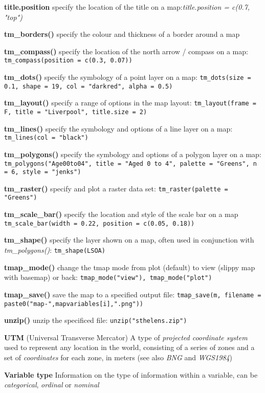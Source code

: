 \documentclass[a4paper,10pt]{article}
\begin{document}
\begin{multicols}{2}
\textbf{title.position} specify the location of the title on a map:\textit{title.position = c(0.7, "top")}

\textbf{tm\_borders()} specify the colour and thickness of a border around a map

\textbf{tm\_compass()} specify the location of the north arrow / compass on a map: \texttt{tm\_compass(position = c(0.3, 0.07))}

\textbf{tm\_dots()} specify the symbology of a point layer on a map: \texttt{tm\_dots(size = 0.1, shape = 19, col = "darkred", alpha = 0.5)}

\textbf{tm\_layout()} specify a range of options in the map layout: \texttt{tm\_layout(frame = F, title = "Liverpool", title.size = 2)}

\textbf{tm\_lines()} specify the symbology and options of a line layer on a map: \texttt{tm\_lines(col = "black")}

\textbf{tm\_polygons()} specify the symbology and options of a polygon layer on a map: \texttt{tm\_polygons("Age00to04", title = "Aged 0 to 4", palette = "Greens", n = 6, style = "jenks")}

\textbf{tm\_raster()} specify and plot a raster data set: \texttt{tm\_raster(palette = "Greens")}

\textbf{tm\_scale\_bar()} specify the location and style of the scale bar on a map \texttt{tm\_scale\_bar(width = 0.22, position = c(0.05, 0.18))}

\textbf{tm\_shape()} specify the layer shown on a map, often used in conjunction with \textit{tm\_polygons()}: \texttt{tm\_shape(LSOA)}

\textbf{tmap\_mode()} change the tmap mode from plot (default) to view (slippy map with basemap) or back: \texttt{tmap\_mode("view"),  tmap\_mode("plot")}

\textbf{tmap\_save()} save the map to a specified output file: \texttt{tmap\_save(m, filename = paste0("map-",mapvariables[i],".png"))}

\textbf{unzip()} unzip the specificed file: \texttt{unzip("sthelens.zip")}

\textbf{UTM} (Universal Transverse Mercator) A type of \textit{projected coordinate system} used to represent any location in the world, consisting of a series of zones and a set of \textit{coordinates} for each zone, in meters (see also \textit{BNG} and \textit{WGS1984}) 

\textbf{Variable type} Information on the type of information within a variable, can be \textit{categorical}, \textit{ordinal} or \textit{nominal} 


\end{multicols}
\end{document}
